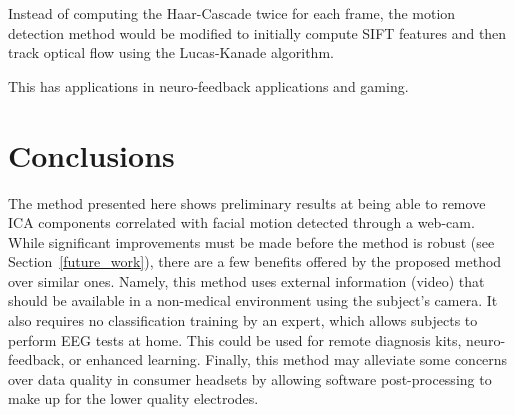 \documentclass{acm_proc_article-sp}
\begin{document}
Instead of computing the Haar-Cascade\cite{haar} twice for each frame, the motion
detection method would be modified to initially compute
SIFT\cite{sift} features and then track optical flow using the
Lucas-Kanade algorithm\cite{lucas1981}.

This has applications in neuro-feedback applications and gaming\cite{akhtar2014}.
\section{Conclusions}
The method presented here shows preliminary results at being able to
remove ICA components correlated with facial motion detected through a
web-cam. While significant improvements must be made before the method
is robust (see Section~\ref{future_work}), there are a few benefits
offered by the proposed method over similar ones. Namely, this method
uses external information (video) that should be available in a
non-medical environment using the subject's camera. It also requires
no classification training by an expert, which allows subjects to
perform EEG tests at home. This could be used for remote diagnosis
kits, neuro-feedback, or enhanced learning. Finally, this method may
alleviate some concerns over data quality in consumer headsets by
allowing software post-processing to make up for the lower quality
electrodes.

{}

\end{document}
